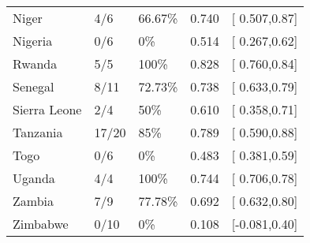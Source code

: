 \begin{table}[ht]
\begin{tabular}{lllrl}
  Niger & 4/6 & 66.67\% & 0.740 & [ 0.507,0.87] \\ 
  Nigeria & 0/6 & 0\% & 0.514 & [ 0.267,0.62] \\ 
  Rwanda & 5/5 & 100\% & 0.828 & [ 0.760,0.84] \\ 
  Senegal & 8/11 & 72.73\% & 0.738 & [ 0.633,0.79] \\ 
  Sierra Leone & 2/4 & 50\% & 0.610 & [ 0.358,0.71] \\ 
  Tanzania & 17/20 & 85\% & 0.789 & [ 0.590,0.88] \\ 
  Togo & 0/6 & 0\% & 0.483 & [ 0.381,0.59] \\ 
  Uganda & 4/4 & 100\% & 0.744 & [ 0.706,0.78] \\ 
  Zambia & 7/9 & 77.78\% & 0.692 & [ 0.632,0.80] \\ 
  Zimbabwe & 0/10 & 0\% & 0.108 & [-0.081,0.40] \\ 
   \hline
\end{tabular}
\end{table}
